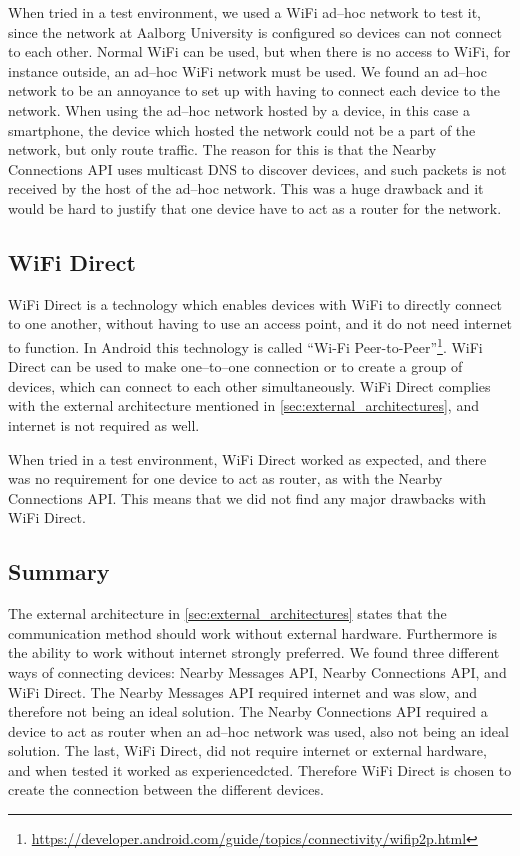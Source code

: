 When tried in a test environment, we used a WiFi ad--hoc network to test it,
since the network at Aalborg University is configured so devices can not connect to each other.
Normal WiFi can be used, but when there is no access to WiFi, for instance outside, an ad--hoc WiFi network must be used.
We found an ad--hoc network to be an annoyance to set up with having to connect each device to the network.
When using the ad--hoc network hosted by a device, in this case a smartphone,
the device which hosted the network could not be a part of the network, but only route traffic.
The reason for this is that the Nearby Connections API uses multicast DNS to discover devices,
and such packets is not received by the host of the ad--hoc network.
This was a huge drawback and it would be hard to justify that one device have to act as a router for the network.

\subsection{WiFi Direct}
WiFi Direct is a technology which enables devices with WiFi to directly connect to one another,
without having to use an access point, and it do not need internet to function.
In Android this technology is called ``Wi-Fi Peer-to-Peer''\footnote{\url{https://developer.android.com/guide/topics/connectivity/wifip2p.html}}.
WiFi Direct can be used to make one--to--one connection or to create a group of devices,
which can connect to each other simultaneously.\cite{wifi_direct}
WiFi Direct complies with the external architecture mentioned in \cref{sec:external_architectures}, and internet is not required as well.

When tried in a test environment, WiFi Direct worked as expected,
and there was no requirement for one device to act as router, as with the Nearby Connections API.
This means that we did not find any major drawbacks with WiFi Direct.

\subsection{Summary}
The external architecture in \cref{sec:external_architectures} states that the communication method should work without external hardware.
Furthermore is the ability to work without internet strongly preferred.
We found three different ways of connecting devices: Nearby Messages API, Nearby Connections API, and WiFi Direct.
The Nearby Messages API required internet and was slow, and therefore not being an ideal solution.
The Nearby Connections API required a device to act as router when an ad--hoc network was used, also not being an ideal solution.
The last, WiFi Direct, did not require internet or external hardware, and when tested it worked as experiencedcted.
Therefore WiFi Direct is chosen to create the connection between the different devices.
